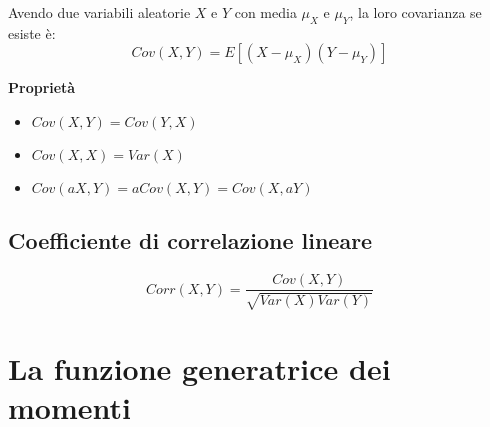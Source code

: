 Avendo due variabili aleatorie $X$ e $Y$ con media $\mu_X$ e $\mu_Y$, la loro covarianza se esiste è:
\begin{equation}
    Cov(X, Y) = E[(X - \mu_X) (Y - \mu_Y)] 
\end{equation}


\textbf{Proprietà}
\begin{itemize}
    \item $Cov(X, Y) = Cov(Y, X)$ 
    \item $Cov(X, X) = Var(X)$ 
    \item $Cov(aX, Y) = a Cov(X, Y) = Cov(X, aY)$ 
\end{itemize}

\subsection{Coefficiente di correlazione lineare}

\begin{equation}
    Corr(X, Y) = \displaystyle\frac{Cov(X, Y)}{\sqrt{Var(X)Var(Y)}} 
\end{equation}

\section{La funzione generatrice dei momenti}




